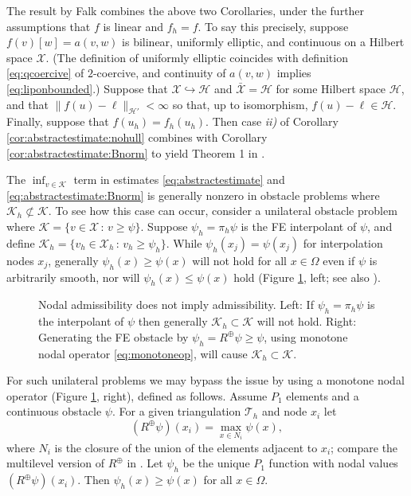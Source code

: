 \documentclass[hidelinks,onefignum,onetabnum,final]{siamart220329}  %
\newcommand{\cH}{\mathcal{H}}
\newcommand{\cK}{\mathcal{K}}
\newcommand{\cT}{\mathcal{T}}
\newcommand{\cX}{\mathcal{X}}
\begin{document}
The result by Falk \cite{Falk1974} combines the above two Corollaries, under the further assumptions that $f$ is linear and $f_h=f$.  To say this precisely, suppose $f(v)[w]=a(v,w)$ is bilinear, uniformly elliptic, and continuous on a Hilbert space $\cX$.  (The definition of uniformly elliptic coincides with definition \eqref{eq:qcoercive} of $2$-coercive, and continuity of $a(v,w)$ implies \eqref{eq:liponbounded}.)  Suppose that $\cX\hookrightarrow \cH$ and $\bar{\cX} = \cH$ for some Hilbert space $\cH$, and that $\|f(u)-\ell\|_{\cH'} < \infty$ so that, up to isomorphism, $f(u)-\ell \in \cH$.  Finally, suppose that $f(u_h)=f_h(u_h)$.  Then case \emph{ii)} of Corollary \ref{cor:abstractestimate:nohull} combines with Corollary \ref{cor:abstractestimate:Bnorm} to yield Theorem 1 in \cite{Falk1974}.

The $\inf_{v\in\cK}$ term in estimates \eqref{eq:abstractestimate} and \eqref{eq:abstractestimate:Bnorm} is generally nonzero in obstacle problems where $\cK_h \not\subset \cK$.  To see how this case can occur, consider a unilateral obstacle problem where $\cK=\{v \in \cX\,:\,v\ge \psi\}$.  Suppose $\psi_h=\pi_h \psi$ is the FE interpolant of $\psi$, and define $\cK_h=\{v_h \in \cX_h\,:\,v_h\ge \psi_h\}$.  While $\psi_h(x_j)=\psi(x_j)$ for interpolation nodes $x_j$, generally $\psi_h(x) \ge \psi(x)$ will not hold for all $x\in\Omega$ even if $\psi$ is arbitrarily smooth, nor will $\psi_h(x) \le \psi(x)$ hold (Figure \ref{fig:nonadmissible}, left; see also \cite[Figure 5.1.3]{Ciarlet2002}).

\begin{figure}[ht]
\begin{center}
 \quad 
\end{center}
\caption{Nodal admissibility does not imply admissibility.  Left: If $\psi_h=\pi_h\psi$ is the interpolant of $\psi$ then generally $\cK_h\subset\cK$ will not hold.  Right: Generating the FE obstacle by $\psi_h=R^{\oplus} \psi \ge \psi$, using monotone nodal operator \eqref{eq:monotoneop}, will cause $\cK_h\subset\cK$.}
\label{fig:nonadmissible}
\end{figure}

For such unilateral problems we may bypass the issue by using a monotone nodal operator (Figure \ref{fig:nonadmissible}, right), defined as follows.  Assume $P_1$ elements and a continuous obstacle $\psi$.  For a given triangulation $\cT_h$ and node $x_i$ let
\begin{equation}
(R^{\oplus}\psi)(x_i) = \max_{x \in N_i} \psi(x), \label{eq:monotoneop}
\end{equation}
where $N_i$ is the closure of the union of the elements adjacent to $x_i$; compare the multilevel version of $R^{\oplus}$ in \cite{BuelerFarrell2024}.  Let $\psi_h$ be the unique $P_1$ function with nodal values $(R^{\oplus}\psi)(x_i)$.  Then $\psi_h(x)\ge \psi(x)$ for all $x\in \Omega$.
\end{document}
